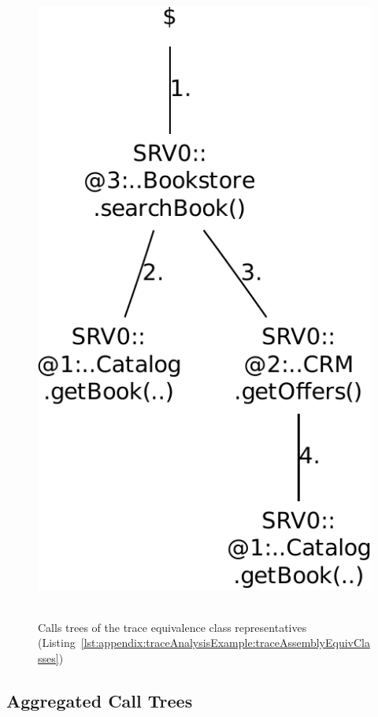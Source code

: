 \begin{figure}[h]
{\ \ \includegraphics[scale=0.4]{images/example-plots/callTree-6488138950668976141-crop}\ \ 
}
\caption{Calls trees of the trace %
equivalence class representatives (Listing~\ref{lst:appendix:traceAnalysisExample:traceAssemblyEquivClasses})}
\end{figure}

\newpage

\subsection{Aggregated Call Trees}


